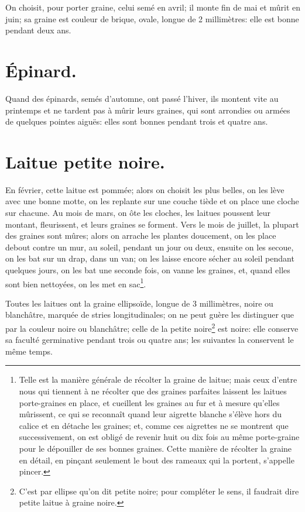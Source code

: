 \documentclass[10pt,a4paper]{book}
\begin{document}
On choisit, pour porter graine, celui semé en avril; il monte fin de mai et mûrit en juin; sa graine est couleur de brique, ovale, longue de 2 millimètres: elle est bonne pendant deux ans.

\section{Épinard.}

Quand des épinards, semés d'automne, ont passé l'hiver, ils montent vite au printemps et ne tardent pas à mûrir leurs graines, qui sont arrondies ou armées de quelques pointes aiguës: elles sont bonnes pendant trois et quatre ans.

\section{Laitue petite noire.}

En février, cette laitue est pommée; alors on choisit les plus belles, on les lève avec une bonne motte, on les replante sur une couche tiède et on place une cloche sur chacune. Au mois de mars, on ôte les cloches, les laitues poussent leur montant, fleurissent, et leurs graines se forment. Vers le mois de juillet, la plupart des graines sont mûres; alors on arrache les plantes doucement, on les place debout contre un mur, au soleil, pendant un jour ou deux, ensuite on les secoue, on les bat sur un drap, dans un van; on les laisse encore sécher au soleil pendant quelques jours, on les bat une seconde fois, on vanne les graines, et, quand elles sont bien nettoyées, on les met en sac\footnote{Telle est la manière générale de récolter la graine de laitue; mais ceux d'entre nous qui tiennent à ne récolter que des graines parfaites laissent les laitues porte-graines en place, et cueillent les graines au fur et à mesure qu'elles mûrissent, ce qui se reconnaît quand leur aigrette blanche s'élève hors du calice et en détache les graines; et, comme ces aigrettes ne se montrent que successivement, on est obligé de revenir huit ou dix fois au même porte-graine pour le dépouiller de ses bonnes graines. Cette manière de récolter la graine en détail, en pinçant seulement le bout des rameaux qui la portent, s'appelle pincer.}.

Toutes les laitues ont la graine ellipsoïde, longue de 3 millimètres, noire ou blanchâtre, marquée de stries longitudinales; on ne peut guère les distinguer que par la couleur noire ou blanchâtre; celle de la petite noire\footnote{C'est par ellipse qu'on dit petite noire; pour compléter le sens, il faudrait dire petite laitue à graine noire.} est noire: elle conserve sa faculté germinative pendant trois ou quatre ans; les suivantes la conservent le même temps.
\end{document}
